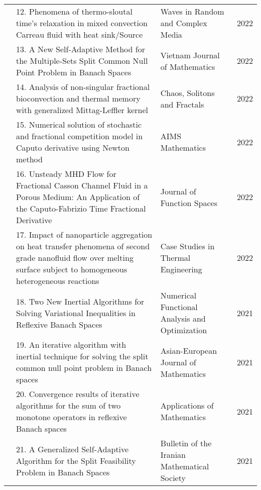 {\begin{center}
\begin{longtable}{|p{}|p{}|p{}|p{}|}
&12. Phenomena of thermo-sloutal time’s relaxation in
mixed convection Carreau fluid with heat sink/Source						
&Waves in Random and Complex Media
&2022 \\ \cline{2-4}

&13. A New Self-Adaptive\newline
Method for the Multiple-Sets Split Common Null 
Point Problem in Banach Spaces
&Vietnam Journal of Mathematics	
&2022 
\\ \cline{2-4}
	
&14.	Analysis of non-singular
fractional bioconvection 
and thermal memory 
with generalized Mittag-Leffler kernel				
&Chaos, Solitons and Fractals
&2022 
\\ \cline{2-4}	

&15. Numerical solution \newline of
stochastic and fractional 
competition model in
Caputo derivative using 
Newton method
&AIMS Mathematics
&2022 \\ \cline{2-4}	

&16. Unsteady MHD Flow for
Fractional Casson Channel
Fluid in a Porous Medium:
An Application of the Caputo-Fabrizio Time  Fractional Derivative
&Journal of Function Spaces
&2022\\ \cline{2-4}	

&17. Impact of nanoparticle
aggregation on heat
transfer phenomena of 
second grade nanofluid
flow over melting surface
subject to homogeneous
heterogeneous reactions			
&Case Studies in Thermal Engineering
&2022\\\cline{2-4}

&18. Two New Inertial \newline
Algorithms for Solving 
Variational Inequalities in 
Reflexive Banach Spaces
&Numerical Functional Analysis 
and Optimization
&2021 
\\ \cline{2-4}

&19. An iterative algorithm
with inertial technique
for solving the split
common null point problem 
in Banach spaces
&Asian-European Journal of Mathematics
&2021 \\ \cline{2-4}		

&20. Convergence results of 
iterative algorithms for 
the sum of two monotone 
operators in reflexive 
Banach spaces					
&Applications of Mathematics
&2021 \\ \cline{2-4}	

&21. A Generalized Self-\newline Adaptive Algorithm for
the Split Feasibility
Problem in Banach Spaces
&Bulletin of the Iranian Mathematical Society		
&2021 \\ \cline{2-4}
	

\end{longtable}
\end{center}}
